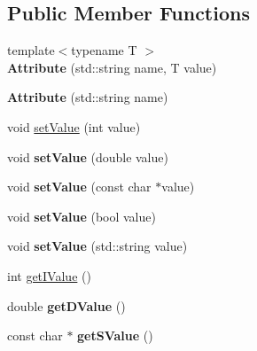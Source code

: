 \subsection*{Public Member Functions}
\begin{DoxyCompactItemize}
\item 
{\footnotesize template$<$typename T $>$ }\\{\bfseries Attribute} (std\+::string name, T value)\hypertarget{classmemgraph_1_1_attribute_a07327464e6605e72a0d1230cfd94f7b6}{}\label{classmemgraph_1_1_attribute_a07327464e6605e72a0d1230cfd94f7b6}

\item 
{\bfseries Attribute} (std\+::string name)\hypertarget{classmemgraph_1_1_attribute_aea37807965e7bfbfa0fd4495007d9407}{}\label{classmemgraph_1_1_attribute_aea37807965e7bfbfa0fd4495007d9407}

\item 
void \hyperlink{classmemgraph_1_1_attribute_a6f2281616f837f9d7bef7954325f81a9}{set\+Value} (int value)
\item 
void {\bfseries set\+Value} (double value)\hypertarget{classmemgraph_1_1_attribute_ac5a26d8c7a7167c0e153279998dbde52}{}\label{classmemgraph_1_1_attribute_ac5a26d8c7a7167c0e153279998dbde52}

\item 
void {\bfseries set\+Value} (const char $\ast$value)\hypertarget{classmemgraph_1_1_attribute_aec81e09e00a625a414bc2ea2088a1750}{}\label{classmemgraph_1_1_attribute_aec81e09e00a625a414bc2ea2088a1750}

\item 
void {\bfseries set\+Value} (bool value)\hypertarget{classmemgraph_1_1_attribute_aea492f299743a263272113b47c8c99a1}{}\label{classmemgraph_1_1_attribute_aea492f299743a263272113b47c8c99a1}

\item 
void {\bfseries set\+Value} (std\+::string value)\hypertarget{classmemgraph_1_1_attribute_a35e0ada995c38f4b3ddf0becb20cc60a}{}\label{classmemgraph_1_1_attribute_a35e0ada995c38f4b3ddf0becb20cc60a}

\item 
int \hyperlink{classmemgraph_1_1_attribute_ad53fcf05ba13e5b794cb27a65256bcc8}{get\+I\+Value} ()
\item 
double {\bfseries get\+D\+Value} ()\hypertarget{classmemgraph_1_1_attribute_a4b9bb0a44778593bca2fdc2871ff3ea0}{}\label{classmemgraph_1_1_attribute_a4b9bb0a44778593bca2fdc2871ff3ea0}

\item 
const char $\ast$ {\bfseries get\+S\+Value} ()\hypertarget{classmemgraph_1_1_attribute_a629512ecae532dce5bd4e1f9a148fc1a}{}\label{classmemgraph_1_1_attribute_a629512ecae532dce5bd4e1f9a148fc1a}


\end{DoxyCompactItemize}
